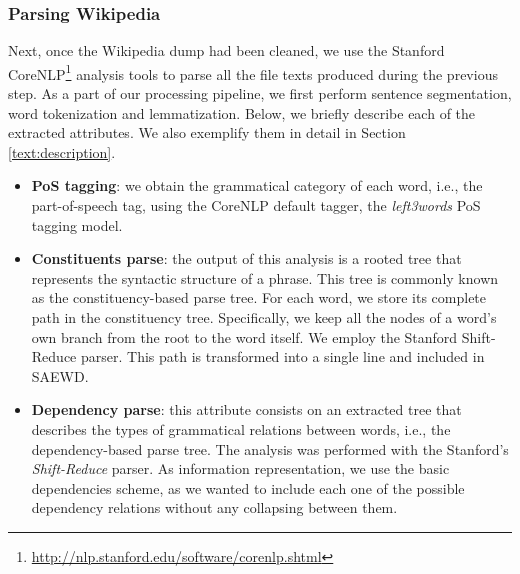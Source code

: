 \subsubsection{Parsing Wikipedia} Next, once the Wikipedia dump had been cleaned, we use the Stanford CoreNLP\footnote{\url{http://nlp.stanford.edu/software/corenlp.shtml}} \cite{manning2014} analysis tools to parse all the file texts produced during the previous step. As a part of our processing pipeline, we first perform  sentence segmentation, word tokenization and lemmatization. Below, we briefly describe each of the extracted attributes. We also exemplify them in detail in Section \ref{text:description}.
\begin{itemize}
\item \textbf{PoS tagging}: we obtain the grammatical category of each word, i.e., the part-of-speech tag, using the CoreNLP default tagger, the \textit{left3words} PoS tagging model.

\item \textbf{Constituents parse}:                                                                                                                                                           
the output of this analysis is a rooted tree that represents the syntactic structure of a phrase.                                                                                  
This tree is commonly known as the constituency-based parse tree.                                                                                                                  
For each word, we store its complete path in the constituency tree.
 Specifically, we keep all the nodes of a word's own branch from the root to the word itself.
 We employ the Stanford Shift-Reduce parser.
 This path is transformed into a single line and included in SAEWD. 
\item \textbf{Dependency parse}: this attribute consists on an extracted tree that describes the types of grammatical relations between words, i.e., the dependency-based parse tree. 
The analysis was performed with the Stanford's \textit{Shift-Reduce}  parser.
As information representation, we use the basic dependencies scheme, as we wanted to include each one of the possible dependency relations without any collapsing between them.     

\end{itemize} 	
